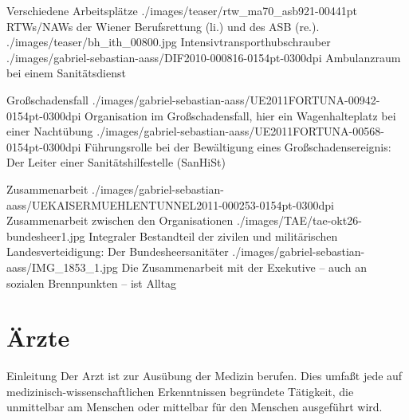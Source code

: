 \begin{PictureSeriesWide}{}{Verschiedene Arbeitsplätze}
{./images/teaser/rtw_ma70_asb921-00441pt}
{RTWs/NAWs der Wiener Berufsrettung (li.) und des ASB (re.).}
{./images/teaser/bh_ith_00800.jpg}
{Intensivtransporthubschrauber}
{./images/gabriel-sebastian-aass/DIF2010-000816-0154pt-0300dpi}
{Ambulanzraum bei einem Sanitätsdienst}
{}
{}
\end{PictureSeriesWide}

\begin{PictureSeriesWide}{}{Großschadensfall}
{./images/gabriel-sebastian-aass/UE2011FORTUNA-00942-0154pt-0300dpi}
{Organisation im Großschadensfall, hier
ein Wagenhalteplatz bei einer Nachtübung}
{./images/gabriel-sebastian-aass/UE2011FORTUNA-00568-0154pt-0300dpi}
{Führungsrolle bei der Bewältigung eines
Großschadensereignis: Der Leiter einer Sanitätshilfestelle
(SanHiSt)}
{}
{}
{}
{}
\end{PictureSeriesWide}




\begin{PictureSeriesWide}{}{Zusammenarbeit}
{./images/gabriel-sebastian-aass/UEKAISERMUEHLENTUNNEL2011-000253-0154pt-0300dpi}
{Zusammenarbeit zwischen den Organisationen}
{./images/TAE/tae-okt26-bundesheer1.jpg}
{Integraler Bestandteil der zivilen
und militärischen Landesverteidigung: Der Bundesheersanitäter}
{./images/gabriel-sebastian-aass/IMG_1853_1.jpg}
{Die Zusammenarbeit mit der Exekutive -- auch an
sozialen Brennpunkten -- ist Alltag}
{}
{}
\end{PictureSeriesWide}






\section{Ärzte}

\Text
{Einleitung}%
{%
Der Arzt ist zur Ausübung der Medizin berufen. Dies umfaßt
jede auf medizinisch-wissenschaftlichen Erkenntnissen
begründete Tätigkeit, die unmittelbar am Menschen oder
mittelbar für den Menschen ausgeführt wird.
}%




